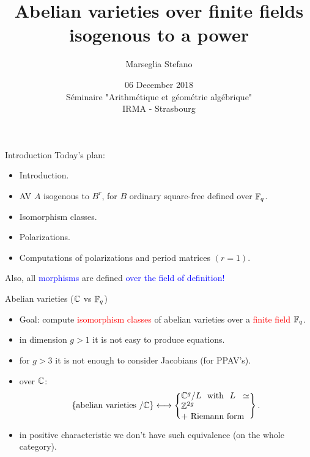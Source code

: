 \documentclass[usenames,dvipsnames]{beamer}
\title[]{Abelian varieties over finite fields isogenous to a power}
\author[Marseglia Stefano]{Marseglia Stefano}
\institute[]{MPIM-Bonn/Stockholms University}
\date[06 December 2018]{06 December 2018\\
	   S\'eminaire "Arithm\'etique et g\'eom\'etrie alg\'ebrique"\\ IRMA - Strasbourg}
\newcommand{\red}[1]{\textcolor{red}{#1}}
\newcommand{\blue}[1]{\textcolor{blue}{#1}}
\begin{document}
\begin{frame}
\titlepage
\end{frame}

\begin{frame}{ Introduction }
Today's plan:
\begin{itemize}
 \item Introduction.
 \item AV $A$ isogenous to $B^r$, for $B$ ordinary square-free defined over $\mathbb{F}_q$.
 \item Isomorphism classes.
 \item Polarizations.
 \item Computations of polarizations and period matrices $(r=1)$.
\end{itemize}
Also, all \blue{morphisms} are defined \blue{over the field of definition!}
\end{frame}

\begin{frame}{ Abelian varieties ($\mathbb{C}$ vs $ \mathbb{F}_q $) }
\begin{itemize}
 \item Goal: compute \red{isomorphism classes} of abelian varieties over a \red{finite field} $\mathbb{F}_q$.
 \pause \item in dimension $g>1$ it is not easy to produce equations.
 \pause \item for $g>3$ it is not enough to consider Jacobians (for PPAV's).
 \pause \item over $\mathbb{C}$:
 \[
      \set{ \text{abelian varieties $/\C$} } \longleftrightarrow 
      \set{\parbox[c]{8em}{$\C^g/L$ with $L\simeq \Z^{2g}$\\ $+$ Riemann form}}.
 \]
 \pause \vspace{-6mm} \item in positive characteristic we don't have such equivalence (on the whole category).
\end{itemize}
\end{frame}
\end{document}
